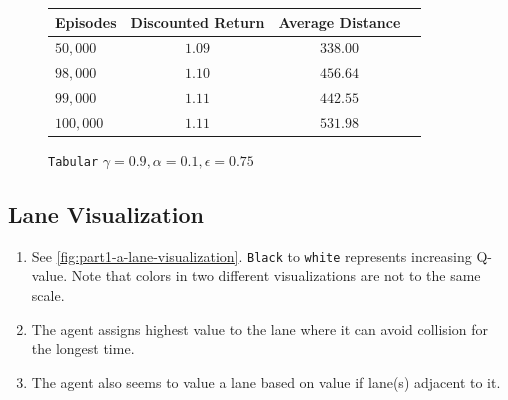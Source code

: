 \begin{figure}[H]
    \vspace{1em}
    \begin{minipage}{\linewidth}
        \centering
        \begin{tabular}{lccc}
            \hline
            Episodes & Discounted Return & Average Distance \\
            \hline
            $50,000$ & $1.09$ & $338.00$ \\
            $98,000$ & $1.10$ & $456.64$ \\
            $99,000$ & $1.11$ & $442.55$ \\
            $100,000$ & $1.11$ & $531.98$ \\
            \hline
        \end{tabular}
        \caption{\texttt{Tabular} $\gamma = 0.9, \alpha = 0.1, \epsilon = 0.75$}
    \end{minipage}
     \label{fig:part1-a}
\end{figure}
\subsection{Lane Visualization}

\begin{enumerate}
\item See \autoref{fig:part1-a-lane-visualization}. \texttt{Black} to \texttt{white} represents increasing Q-value. Note that colors in two different visualizations are not to the same scale.
\item The agent assigns highest value to the lane where it can avoid collision for the longest time.
\item The agent also seems to value a lane based on value if lane(s) adjacent to it. 
\end{enumerate}

